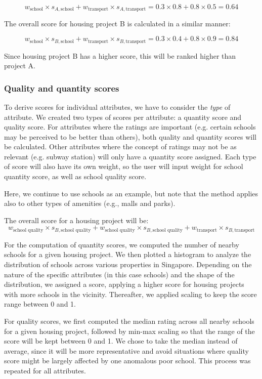 \documentclass[a4paper, 11pt]{article}
\begin{document}
\[ w_{\text{school}} \times s_{A,\text{school}} + w_{\text{transport}} \times s_{A,\text{transport}} = 0.3 \times 0.8 + 0.8 \times 0.5 = 0.64 \]

The overall score for housing project B is calculated in a similar manner:

    \[ w_{\text{school}} \times s_{B,\text{school}} + w_{\text{transport}} \times s_{B,\text{transport}} = 0.3 \times 0.4 + 0.8 \times 0.9 = 0.84 \]

Since housing project B has a higher score, this will be ranked higher than project A.

\subsubsection{Quality and quantity scores}

To derive scores for individual attributes, we have to consider the \textit{type} of attribute. We created two types of scores per attribute: a quantity score and quality score.  For attributes where the ratings are important (e.g. certain schools may be perceived to be better than others), both quality and quantity scores will be calculated. Other attributes where the concept of ratings may not be as relevant (e.g. subway station) will only have a quantity score assigned. Each type of score will also have its own weight, so the user will input weight for school quantity score, as well as school quality score.

Here, we continue to use schools as an example, but note that the method applies also to other types of amenities (e.g., malls and parks).

The overall score for a housing project will be: \[ w_{\text{school quality}} \times s_{B,\text{school quality}} + w_{\text{school quality}} \times s_{B,\text{school quality}} + w_{\text{transport}} \times s_{B,\text{transport}} \]

For the computation of quantity scores, we computed the number of nearby schools for a given housing project. We then plotted a histogram to analyze the distribution of schools across various properties in Singapore. Depending on the nature of the specific attributes (in this case schools) and the shape of the distribution, we assigned a score, applying a higher score for housing projects with more schools in the vicinity. Thereafter, we applied scaling to keep the score range between 0 and 1.

For quality scores, we first computed the median rating across all nearby schools for a given housing project, followed by min-max scaling so that the range of the score will be kept between 0 and 1. We chose to take the median instead of average, since it will be more representative and avoid situations where quality score might be largely affected by one anomalous poor school. This process was repeated for all attributes.
\end{document}
